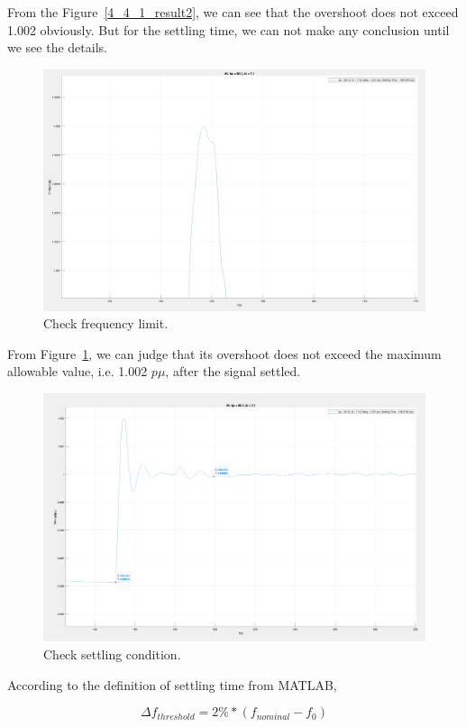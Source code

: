From the Figure~\ref{4_4_1_result2}, we can see that the overshoot does not exceed 1.002 obviously. But for the settling time, we can not make any conclusion until we see the details.\\ 


\begin{figure}[htbp]
\centering
\includegraphics[width = .819\textwidth]{figure/4_4_1_result3.png}
\caption{Check frequency limit.}
\label{4_4_1_result3}
\end{figure}

From Figure~\ref{4_4_1_result3}, we can judge that its overshoot does not exceed the maximum allowable value, i.e. 1.002 $p\mu$, after the signal settled.\\

\begin{figure}[htbp]
\centering
\includegraphics[width = .819\textwidth]{figure/4_4_1_result4.png}
\caption{Check settling condition.}
\label{4_4_1_result4}
\end{figure}

According to the definition of settling time from MATLAB,

\begin{equation}
    \Delta f_{threshold} = 2\% * (f_{nominal} - f_0)
\end{equation}

